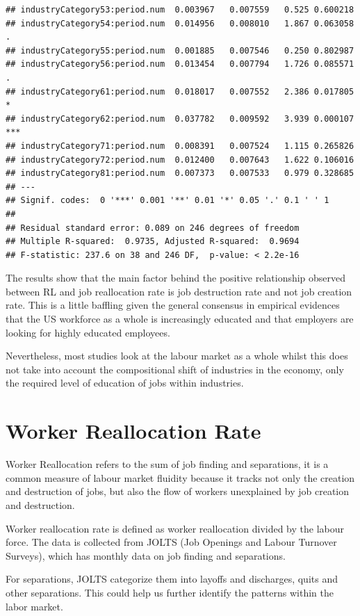 \documentclass[
]{article}
\begin{document}
\begin{verbatim}
## industryCategory53:period.num  0.003967   0.007559   0.525 0.600218    
## industryCategory54:period.num  0.014956   0.008010   1.867 0.063058 .  
## industryCategory55:period.num  0.001885   0.007546   0.250 0.802987    
## industryCategory56:period.num  0.013454   0.007794   1.726 0.085571 .  
## industryCategory61:period.num  0.018017   0.007552   2.386 0.017805 *  
## industryCategory62:period.num  0.037782   0.009592   3.939 0.000107 ***
## industryCategory71:period.num  0.008391   0.007524   1.115 0.265826    
## industryCategory72:period.num  0.012400   0.007643   1.622 0.106016    
## industryCategory81:period.num  0.007373   0.007533   0.979 0.328685    
## ---
## Signif. codes:  0 '***' 0.001 '**' 0.01 '*' 0.05 '.' 0.1 ' ' 1
## 
## Residual standard error: 0.089 on 246 degrees of freedom
## Multiple R-squared:  0.9735, Adjusted R-squared:  0.9694 
## F-statistic: 237.6 on 38 and 246 DF,  p-value: < 2.2e-16
\end{verbatim}

The results show that the main factor behind the positive relationship
observed between RL and job reallocation rate is job destruction rate
and not job creation rate. This is a little baffling given the general
consensus in empirical evidences that the US workforce as a whole is
increasingly educated and that employers are looking for highly educated
employees.

Nevertheless, most studies look at the labour market as a whole whilst
this does not take into account the compositional shift of industries in
the economy, only the required level of education of jobs within
industries.

\hypertarget{worker-reallocation-rate}{%
\section{Worker Reallocation Rate}\label{worker-reallocation-rate}}

Worker Reallocation refers to the sum of job finding and separations, it
is a common measure of labour market fluidity because it tracks not only
the creation and destruction of jobs, but also the flow of workers
unexplained by job creation and destruction.

Worker reallocation rate is defined as worker reallocation divided by
the labour force. The data is collected from JOLTS (Job Openings and
Labour Turnover Surveys), which has monthly data on job finding and
separations.

For separations, JOLTS categorize them into layoffs and discharges,
quits and other separations. This could help us further identify the
patterns within the labor market.
\end{document}

